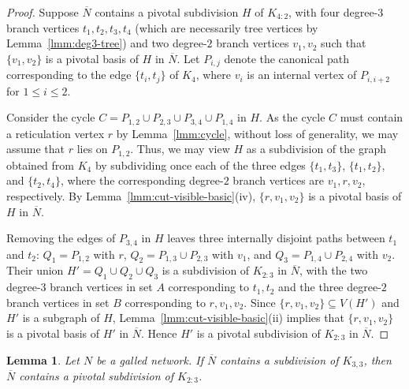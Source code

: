 \documentclass[pdflatex,sn-mathphys-num]{sn-jnl}
\theoremstyle{thmstyleone}%
\theoremstyle{thmstyletwo}%
\newtheorem{lemma}{Lemma}
\theoremstyle{thmstylethree}%
\begin{document}
\begin{proof}
Suppose $\overline{N}$ contains a pivotal subdivision $H$ of $K_{4:2}$, with four degree-$3$ branch vertices $t_1,t_2,t_3,t_4$ (which are necessarily tree vertices by Lemma~\ref{lmm:deg3-tree}) and two degree-$2$ branch vertices $v_1,v_2$ such that $\{v_1,v_2\}$ is a pivotal basis of $H$ in $\overline{N}$. 
Let $P_{i,j}$ denote the canonical path corresponding to the edge $\{t_i,t_j\}$ of $K_{4}$, where $v_i$ is an internal vertex of $P_{i,i+2}$ for $1\le i\le 2$.



Consider the cycle $C=P_{1,2}\cup P_{2,3}\cup P_{3,4}\cup P_{1,4}$ in $H$. As the cycle $C$ must contain a reticulation vertex $r$ by Lemma~\ref{lmm:cycle}, without loss of generality, we may assume that $r$ lies on $P_{1,2}$. Thus, we may view $H$ as a subdivision of the graph obtained from $K_4$ by subdividing once each of the three edges $\{t_1,t_3\}$, $\{t_1,t_2\}$, and $\{t_2,t_4\}$, where the corresponding degree-$2$ branch vertices are $v_1,r,v_2$, respectively. By
Lemma~\ref{lmm:cut-visible-basic}(iv), $\{r,v_1,v_2\}$ is a pivotal basis of $H$ in $\overline{N}$.


Removing the edges of $P_{3,4}$ in $H$ leaves three internally disjoint paths between $t_1$ and $t_2$: $Q_1=P_{1,2}$ with $r$, $Q_2=P_{1,3}\cup P_{2,3}$ with $v_1$, and $Q_3=P_{1,4}\cup P_{2,4}$ with $v_2$. Their union $H'=Q_1 \cup Q_2 \cup Q_3$ is a subdivision of $K_{2:3}$ in $\overline{N}$, with the two degree-$3$ branch vertices in set $A$ corresponding to $t_1,t_2$ and the three degree-$2$ branch vertices in set $B$ corresponding to $r,v_1,v_2$.
Since $\{r,v_1,v_2\}\subseteq V(H')$ and $H'$ is a subgraph of $H$, Lemma~\ref{lmm:cut-visible-basic}(ii) implies that $\{r,v_1,v_2\}$ is a pivotal basis of $H'$ in $\overline{N}$. Hence $H'$ is a pivotal subdivision of $K_{2:3}$ in $\overline{N}$.
\end{proof}






\begin{lemma}\label{lem:k33_to_k23}
Let $N$ be a galled network. If $\overline{N}$ contains a subdivision of $K_{3,3}$, then $\overline{N}$ contains a pivotal subdivision of $K_{2:3}$.
\end{lemma}
\end{document}

